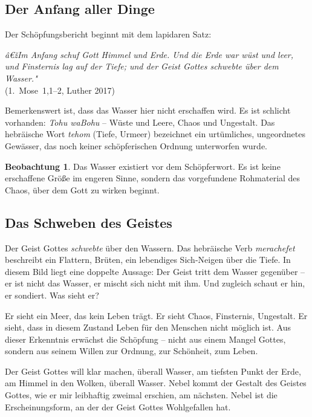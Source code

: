 ﻿\documentclass[a4paper,12pt]{article}
\theoremstyle{definition}
\newtheorem{observation}{Beobachtung}[section]
\begin{document}
\subsection{Der Anfang aller Dinge}

Der Schöpfungsbericht beginnt mit dem lapidaren Satz:

\begin{displayquote}
    \textit{â€žIm Anfang schuf Gott Himmel und Erde. Und die Erde war wüst und leer,
    und Finsternis lag auf der Tiefe; und der Geist Gottes schwebte über dem
    Wasser."}\\
    \hfill (1.~Mose~1,1--2, Luther 2017)
\end{displayquote}

Bemerkenswert ist, dass das Wasser hier nicht erschaffen wird. Es ist schlicht
vorhanden: \textit{Tohu waBohu} -- Wüste und Leere, Chaos und Ungestalt. Das
hebräische Wort \textit{tehom} (Tiefe, Urmeer) bezeichnet ein urtümliches,
ungeordnetes Gewässer, das noch keiner schöpferischen Ordnung unterworfen wurde.

\begin{observation}
    Das Wasser existiert vor dem Schöpferwort. Es ist keine erschaffene Größe im
    engeren Sinne, sondern das vorgefundene Rohmaterial des Chaos, über dem Gott
    zu wirken beginnt.
\end{observation}

\subsection{Das Schweben des Geistes}

Der Geist Gottes \textit{schwebte} über den Wassern. Das hebräische Verb
\textit{merachefet} beschreibt ein Flattern, Brüten, ein lebendiges Sich-Neigen
über die Tiefe. In diesem Bild liegt eine doppelte Aussage: Der Geist tritt dem
Wasser gegenüber -- er ist nicht das Wasser, er mischt sich nicht mit ihm. Und
zugleich schaut er hin, er sondiert. Was sieht er?

Er sieht ein Meer, das kein Leben trägt. Er sieht Chaos, Finsternis, Ungestalt.
Er sieht, dass in diesem Zustand Leben für den Menschen nicht möglich ist.
Aus dieser Erkenntnis erwächst die Schöpfung -- nicht aus einem Mangel Gottes,
sondern aus seinem Willen zur Ordnung, zur Schönheit, zum Leben.

Der Geist Gottes will klar machen, überall Wasser, am tiefsten Punkt der Erde, am Himmel in den Wolken, überall Wasser. Nebel kommt der Gestalt des Geistes Gottes, wie er mir leibhaftig zweimal erschien, am nächsten. Nebel ist die Erscheinungsform, an der der Geist Gottes Wohlgefallen hat.
\end{document}
